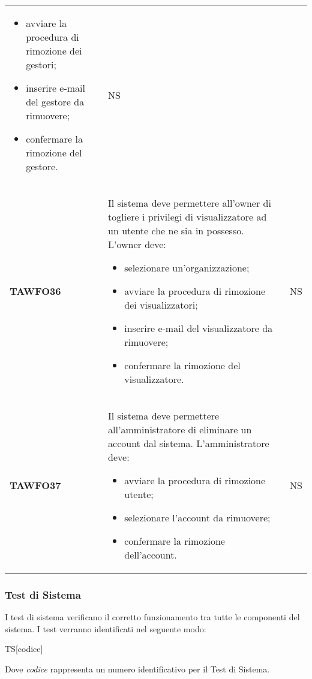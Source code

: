 \documentclass[../piano-di-qualifica.tex]{subfiles}
\begin{document}
\begin{centering}
\begin{longtable}[H]{>{\centering\bfseries}m{3cm} >{}p{10cm} >{\centering\arraybackslash}m{3cm}}
\begin{itemize}
         \item avviare la procedura di rimozione dei gestori;
         \item inserire e-mail del gestore da rimuovere;
         \item confermare la rimozione del gestore.
        \end{itemize}
        & NS \\
        TAWFO36      & Il sistema deve permettere all’owner di togliere i privilegi di visualizzatore ad un utente che ne sia in possesso. \newline
        L'owner deve: 
        \begin{itemize} 
         \item selezionare un'organizzazione;
         \item avviare la procedura di rimozione dei visualizzatori;
         \item inserire e-mail del visualizzatore da rimuovere;
         \item confermare la rimozione del visualizzatore.
        \end{itemize}
        & NS \\
        TAWFO37      & Il sistema deve permettere all’amministratore di eliminare un account dal sistema. \newline
        L'amministratore deve: 
        \begin{itemize} 
         \item avviare la procedura di rimozione utente;
         \item selezionare l'account da rimuovere;
         \item confermare la rimozione dell'account.
        \end{itemize}
        & NS \\


      \end{longtable}
    \end{centering}
    \subsubsection{Test di Sistema}
  \label{subs:sistema}
    I test di sistema verificano il corretto funzionamento tra tutte le componenti del sistema. I test verranno identificati nel seguente modo:
    \begin{center}
      TS[codice]
    \end{center}
    Dove \textit{codice} rappresenta un numero identificativo per il Test di Sistema.
\end{document}

